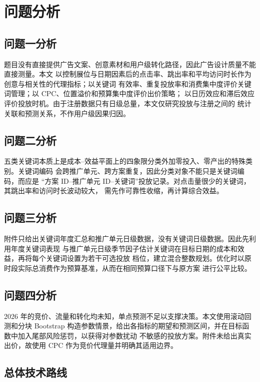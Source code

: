 \documentclass[UTF8,a4paper,zihao=-4]{ctexart}
\begin{document}
\section{问题分析}

\subsection{问题一分析}

题目没有直接提供广告文案、创意素材和用户级转化路径，因此广告设计质量不能直接测量。本文
以控制展位与日期因素后的点击率、跳出率和平均访问时长作为创意与相关性的代理指标；以关键词
有效率、重复投放率和消费集中度评价关键词管理；以 CPC、位置溢价和预算集中度评价出价策略；
以日历效应和滞后效应评价投放时机。由于注册数据只有日级总量，本文仅研究投放与注册之间的
统计关联和预测关系，不作用户级因果归因。

\subsection{问题二分析}

五类关键词本质上是成本--效益平面上的四象限分类外加零投入、零产出的特殊类别。关键词编码
会跨推广单元、跨方案重复，因此分类对象不能只是关键词编码，而应是
“方案 ID--推广单元 ID--关键词”投放记录。对点击量很少的关键词，其跳出率和访问时长波动较大，
需先作可靠性收缩，再计算综合效益。

\subsection{问题三分析}

附件只给出关键词年度汇总和推广单元日级数据，没有关键词日级数据。因此先利用年度关键词表现
与推广单元日级季节因子估计关键词在目标日期的成本和效益，再将每个关键词设置为若干可选投放
档位，建立混合整数规划。优化时以原时段实际总消费作为预算基准，从而在相同预算口径下与原方案
进行公平比较。

\subsection{问题四分析}

2026 年的竞价、流量和转化均未知，单点预测不足以支撑决策。本文使用滚动回测和分块 Bootstrap
构造参数情景，给出各指标的期望和预测区间，并在目标函数中加入尾部风险惩罚，以获得对参数扰动
不敏感的投放方案。附件未给出真实出价，故使用 CPC 作为竞价代理量并明确其适用边界。

\subsection{总体技术路线}
\end{document}
